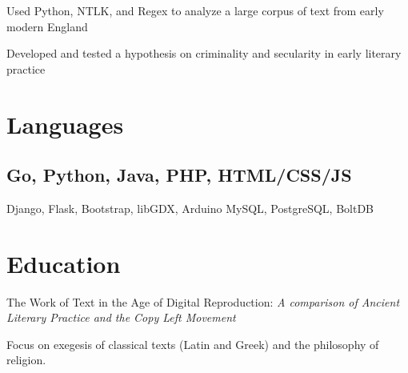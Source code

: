 \documentclass[]{deedy-resume-openfont}
\begin{document}
\begin{tightemize}
\item Used Python, NTLK, and Regex to analyze a large corpus of text from early modern England
\item Developed and tested a hypothesis on criminality and secularity in early literary practice
\end{tightemize}

\section{Languages}
\subsection{Go, Python, Java, PHP, HTML/CSS/JS} 
Django, Flask, Bootstrap, libGDX, Arduino \textbullet{} MySQL, PostgreSQL, BoltDB


\section{Education}
The Work of Text in the Age of Digital Reproduction:
\textit{A comparison of Ancient Literary Practice and the Copy Left Movement}

Focus on exegesis of classical texts (Latin and Greek) and the philosophy of religion.
\sectionsep
\end{document}

